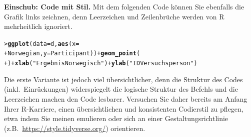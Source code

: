 \documentclass[oneside, 10pt]{book}\usepackage[]{graphicx}\usepackage[]{xcolor}
\makeatletter
\newcommand{\hlstr}[1]{\textcolor[rgb]{0.192,0.494,0.8}{#1}}%
\newcommand{\hlopt}[1]{\textcolor[rgb]{0,0,0}{#1}}%
\newcommand{\hlstd}[1]{\textcolor[rgb]{0.345,0.345,0.345}{#1}}%
\newcommand{\hlkwc}[1]{\textcolor[rgb]{0.333,0.667,0.333}{#1}}%
\newcommand{\hlkwd}[1]{\textcolor[rgb]{0.737,0.353,0.396}{\textbf{#1}}}%
\newenvironment{kframe}{%
 \def\at@end@of@kframe{}%
 \ifinner\ifhmode%
  \def\at@end@of@kframe{\end{minipage}}%
  \begin{minipage}{\columnwidth}%
 \fi\fi%
 \def\FrameCommand##1{\hskip\@totalleftmargin \hskip-\fboxsep
 \colorbox{shadecolor}{##1}\hskip-\fboxsep
     \hskip-\linewidth \hskip-\@totalleftmargin \hskip\columnwidth}%
 \MakeFramed {\advance\hsize-\width
   \@totalleftmargin\z@ \linewidth\hsize
   \@setminipage}}%
 {\par\unskip\endMakeFramed%
 \at@end@of@kframe}
\newenvironment{knitrout}{}{} %
\makeatother
\begin{document}
\medskip

\begin{framed}
\textbf{Einschub: Code mit Stil.}
Mit dem folgenden Code können Sie ebenfalls die Grafik links
zeichnen, denn Leerzeichen und Zeilenbrüche werden von R
mehrheitlich ignoriert.
\begin{knitrout}
\color{fgcolor}\begin{kframe}
\begin{alltt}
\hlstd{> }\hlkwd{ggplot}\hlstd{(}\hlkwc{data}\hlstd{=d,}\hlkwd{aes}\hlstd{(}\hlkwc{x}\hlstd{=}
\hlstd{+ }\hlstd{Norwegian,}\hlkwc{y}\hlstd{=Participant))}\hlopt{+}\hlkwd{geom_point}\hlstd{(}
\hlstd{+ }\hlstd{)}\hlopt{+}\hlkwd{xlab}\hlstd{(}\hlstr{"Ergebnis Norwegisch"}\hlstd{)}\hlopt{+}\hlkwd{ylab}\hlstd{(}\hlstr{"ID Versuchsperson"}\hlstd{)}
\end{alltt}
\end{kframe}
\end{knitrout}
Die erste Variante ist jedoch viel übersichtlicher, denn
die Struktur des Codes (inkl.\ Einrückungen) widerspiegelt
die logische Struktur des Befehls und die Leerzeichen
machen den Code lesbarer.
Versuchen Sie daher bereits am Anfang Ihrer R-Karriere,
einen übersichtlichen und konsistenten Codierstil zu pflegen,
etwa indem Sie meinen emulieren oder sich an einer
Gestaltungsrichtlinie (z.B.\ \url{https://style.tidyverse.org/}) orientieren.
\end{framed}

\medskip
\end{document}
